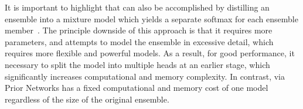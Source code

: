 It is important to highlight that \Endd can also be accomplished by distilling an ensemble into a mixture model which yields a separate softmax for each ensemble member~\cite{hydra,mdd}. The principle downside of this approach is that it requires more parameters, and attempts to model the ensemble in excessive detail, which requires more flexible and powerful models. As a result, for good performance, it necessary to split the model into multiple heads at an earlier stage, which significantly increases computational and memory complexity. In contrast, \Endd via Prior Networks has a fixed computational and memory cost of one model regardless of the size of the original ensemble. 







